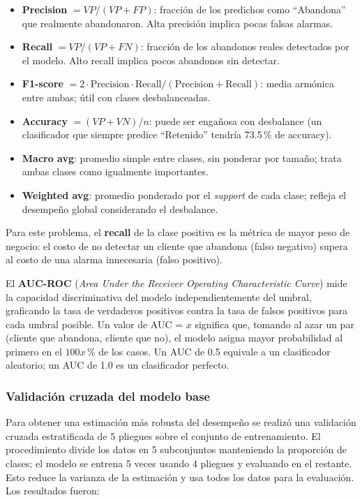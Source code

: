 \documentclass[spanish]{article}
\begin{document}
\begin{itemize}
    \item \textbf{Precision} $= VP / (VP + FP)$: fracción de los predichos como ``Abandona'' que realmente abandonaron. Alta precisión implica pocas falsas alarmas.
    \item \textbf{Recall} $= VP / (VP + FN)$: fracción de los abandonos reales detectados por el modelo. Alto recall implica pocos abandonos sin detectar.
    \item \textbf{F1-score} $= 2 \cdot \text{Precision} \cdot \text{Recall} / (\text{Precision} + \text{Recall})$: media armónica entre ambas; útil con clases desbalanceadas.
    \item \textbf{Accuracy} $= (VP + VN) / n$: puede ser engañosa con desbalance (un clasificador que siempre predice ``Retenido'' tendría 73.5\,\% de accuracy).
    \item \textbf{Macro avg}: promedio simple entre clases, sin ponderar por tamaño; trata ambas clases como igualmente importantes.
    \item \textbf{Weighted avg}: promedio ponderado por el \textit{support} de cada clase; refleja el desempeño global considerando el desbalance.
\end{itemize}

Para este problema, el \textbf{recall} de la clase positiva es la métrica de mayor peso de negocio: el costo de no detectar un cliente que abandona (falso negativo) supera al costo de una alarma innecesaria (falso positivo).

El \textbf{AUC-ROC} (\textit{Area Under the Receiver Operating Characteristic Curve}) mide la capacidad discriminativa del modelo independientemente del umbral, graficando la tasa de verdaderos positivos contra la tasa de falsos positivos para cada umbral posible. Un valor de AUC = $x$ significa que, tomando al azar un par (cliente que abandona, cliente que no), el modelo asigna mayor probabilidad al primero en el $100x$\,\% de los casos. Un AUC de 0.5 equivale a un clasificador aleatorio; un AUC de 1.0 es un clasificador perfecto.

\subsubsection{Validación cruzada del modelo base}

Para obtener una estimación más robusta del desempeño se realizó una validación cruzada estratificada de 5 pliegues sobre el conjunto de entrenamiento. El procedimiento divide los datos en 5 subconjuntos manteniendo la proporción de clases; el modelo se entrena 5 veces usando 4 pliegues y evaluando en el restante. Esto reduce la varianza de la estimación y usa todos los datos para la evaluación. Los resultados fueron:
\end{document}
